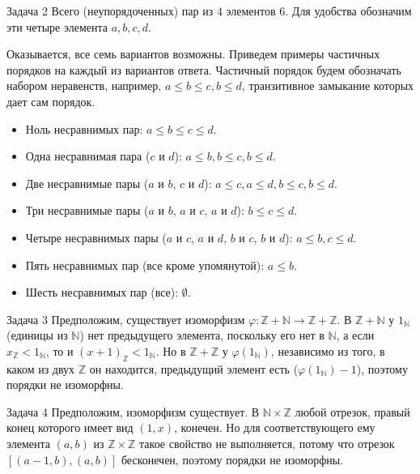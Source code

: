 \documentclass{article}
\newcommand{\N}{\mathbb{N}}
\newcommand{\Z}{\mathbb{Z}}
\begin{document}
	\begin{section}{Задача 2}
		Всего (неупорядоченных) пар из $4$ элементов $6$. Для удобства обозначим эти четыре элемента $a, b, c, d$.

		Оказывается, все семь вариантов возможны. Приведем примеры частичных порядков на каждый из вариантов ответа. Частичный порядок будем обозначать набором неравенств, например, $a \le b \le c, b \le d$, транзитивное замыкание которых дает сам порядок.

		\begin{itemize}
			\item Ноль несравнимых пар: $a \le b \le c \le d$.
			\item Одна несравнимая пара ($c$ и $d$): $a \le b, b \le c, b \le d$.
			\item Две несравнимые пары ($a$ и $b$, $c$ и $d$): $a \le c, a \le d, b \le c, b \le d$.
			\item Три несравнимые пары ($a$ и $b$, $a$ и $c$, $a$ и $d$): $b \le c \le d$.
			\item Четыре несравнимых пары ($a$ и $c$, $a$ и $d$, $b$ и $c$, $b$ и $d$): $a \le b, c \le d$.
			\item Пять несравнимых пар (все кроме упомянутой): $a \le b$.
			\item Шесть несравнимых пар (все): $\emptyset$.
		\end{itemize}
	\end{section}

	\begin{section}{Задача 3}
		Предположим, существует изоморфизм $\varphi: \Z + \N \to \Z + \Z$. В $\Z + \N$ у $1_{\N}$ (единицы из $\N$) нет предыдущего элемента, поскольку его нет в $\N$, а если $x_{\Z} < 1_{\N}$, то и $(x+1)_{\Z} < 1_{\N}$. Но в $\Z + \Z$ у $\varphi(1_{\N})$, независимо из того, в каком из двух $\Z$ он находится, предыдущий элемент есть ($\varphi(1_{\N}) - 1$), поэтому порядки не изоморфны.
	\end{section}

	\begin{section}{Задача 4}
		Предположим, изоморфизм существует. В $\N \times \Z$ любой отрезок, правый конец которого имеет вид $(1, x)$, конечен. Но для соответствующего ему элемента $(a, b)$ из $\Z \times \Z$ такое свойство не выполняется, потому что отрезок $[(a - 1, b), (a, b)]$ бесконечен, поэтому порядки не изоморфны.
	\end{section}
\end{document}
